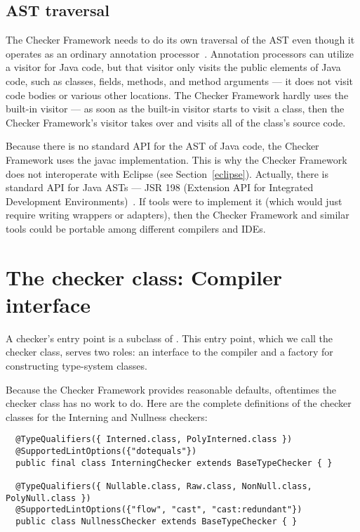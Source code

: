 \subsection{AST traversal\label{ast-traversal}}

The Checker Framework needs to do its own traversal of the AST even though
it operates as an ordinary annotation processor~\cite{JSR269}.  Annotation
processors can utilize a visitor for Java code, but that visitor only
visits the public elements of Java code, such as classes, fields, methods,
and method arguments --- it does not visit code bodies or various other
locations.  The Checker Framework hardly uses the built-in visitor --- as
soon as the built-in visitor starts to visit a class, then the Checker
Framework's visitor takes over and visits all of the class's source code.

Because there is no standard API for the AST of Java code, the Checker
Framework uses the javac implementation.  This is why the Checker Framework
does not interoperate with Eclipse (see Section~\ref{eclipse}).  Actually,
there is standard API for Java ASTs --- JSR 198 (Extension API for
Integrated Development Environments)~\cite{JSR198}.  If tools were to
implement it
(which would just require writing wrappers or adapters), then the Checker
Framework and similar tools could be portable among different compilers and
IDEs.


\section{The checker class:  Compiler interface\label{writing-compiler-interface}}

A checker's entry point is a subclass of .  This entry
point, which we call the checker class, serves two
roles:  an interface to the compiler and a factory for constructing
type-system classes.

Because the Checker Framework provides reasonable defaults, oftentimes the
checker class has no work to do.  Here are the complete definitions of the
checker classes for the Interning and Nullness checkers:

\begin{Verbatim}
  @TypeQualifiers({ Interned.class, PolyInterned.class })
  @SupportedLintOptions({"dotequals"})
  public final class InterningChecker extends BaseTypeChecker { }

  @TypeQualifiers({ Nullable.class, Raw.class, NonNull.class, PolyNull.class })
  @SupportedLintOptions({"flow", "cast", "cast:redundant"})
  public class NullnessChecker extends BaseTypeChecker { }
\end{Verbatim}


